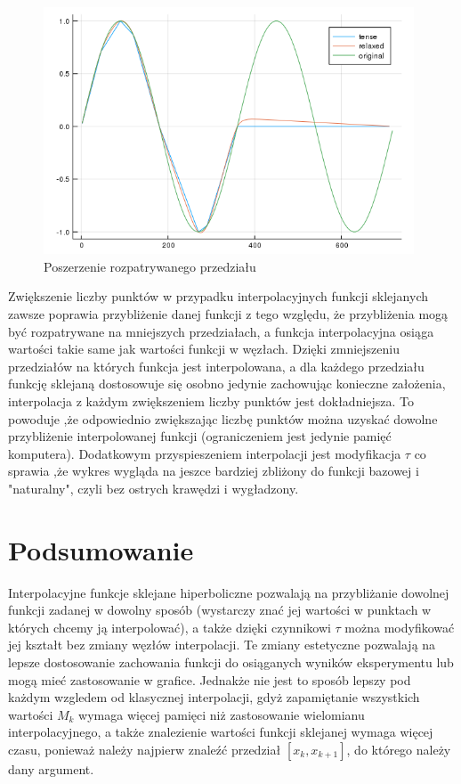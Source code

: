 \documentclass{article}
\begin{document}
\begin{figure}[h]
  \begin{center}
  \includegraphics[width=11cm]{sin2}
  \end{center}
  \caption{Poszerzenie rozpatrywanego przedziału}
  \label{fig:rysunek}
\end{figure}
Zwiększenie liczby punktów w przypadku interpolacyjnych funkcji sklejanych zawsze poprawia przybliżenie danej funkcji z tego względu, że przybliżenia mogą być rozpatrywane na mniejszych przedziałach, a funkcja interpolacyjna osiąga wartości takie same jak wartości funkcji w węzłach. Dzięki zmniejszeniu przedziałów na których funkcja jest interpolowana, a dla każdego przedziału funkcję sklejaną dostosowuje się osobno jedynie zachowując konieczne założenia, interpolacja z każdym zwiększeniem liczby punktów jest dokładniejsza. To powoduje ,że odpowiednio zwiększając liczbę punktów można uzyskać dowolne przybliżenie interpolowanej funkcji (ograniczeniem jest jedynie pamięć komputera). Dodatkowym przyspieszeniem interpolacji jest modyfikacja $\tau$ co sprawia ,że wykres wygląda na jeszce bardziej zbliżony do funkcji bazowej i "naturalny", czyli bez ostrych krawędzi i wygładzony.

\section{Podsumowanie}
Interpolacyjne funkcje sklejane hiperboliczne pozwalają na przybliżanie dowolnej funkcji zadanej w dowolny sposób (wystarczy znać jej wartości w punktach w których chcemy ją interpolować), a także dzięki czynnikowi $\tau$ można modyfikować jej kształt bez zmiany węzłów interpolacji. Te zmiany estetyczne pozwalają na lepsze dostosowanie zachowania funkcji do osiąganych wyników eksperymentu lub mogą mieć zastosowanie w grafice. Jednakże nie jest to sposób lepszy pod każdym wzgledem od klasycznej interpolacji, gdyż zapamiętanie wszystkich wartości $M_{k}$ wymaga więcej pamięci niż zastosowanie wielomianu interpolacyjnego, a także znalezienie wartości funkcji sklejanej wymaga więcej czasu, ponieważ należy najpierw znaleźć przedział $[x_{k}, x_{k+1}]$, do którego należy dany argument.
\end{document}
